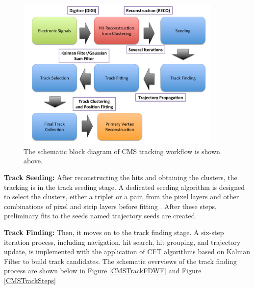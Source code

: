 \begin{figure}[hbtp]
\begin{center}
\includegraphics[width=0.90\textwidth]{Figures/Chapter4/TrackWF.pdf}
\caption{The schematic block diagram of CMS tracking workflow is shown above.}
\label{TrackWorkFlow}
\end{center}
\end{figure} 



\textbf{Track Seeding:} After reconstructing the hits and obtaining the clusters, the tracking is in the track seeding stage. A dedicated seeding algorithm is designed to select the clusters, either a triplet or a pair, from the pixel layers and other combinations of pixel and strip layers before fitting \cite{CMSTrackComp}. After these steps, preliminary fits to the seeds named trajectory seeds are created.


\textbf{Track Finding:} Then, it moves on to the track finding stage. A six-step iteration process, including navigation, hit search, hit grouping, and trajectory update, is implemented with the application of CFT algorithms based on Kalman Filter to build track candidates. The schematic overviews of the track finding process are shown below in Figure \ref{CMSTrackFDWF} and Figure \ref{CMSTrackSteps}

